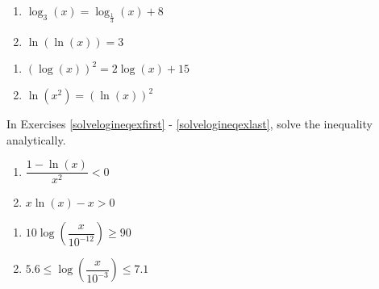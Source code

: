 \begin{multicols}{2}
\begin{enumerate}
\setcounter{enumi}{\value{HW}}

\item $\log_{3}(x) = \log_{\frac{1}{3}}(x) + 8$

\item $\ln(\ln(x)) = 3$

\setcounter{HW}{\value{enumi}}
\end{enumerate}
\end{multicols}

\begin{multicols}{2}
\begin{enumerate}
\setcounter{enumi}{\value{HW}}

\item $\left(\log(x)\right)^2=2\log(x)+15$

\item $\ln(x^{2}) = (\ln(x))^{2}$ \label{solvelogeqexlast}

\setcounter{HW}{\value{enumi}}
\end{enumerate}
\end{multicols}


In Exercises \ref{solvelogineqexfirst} - \ref{solvelogineqexlast}, solve the inequality analytically.

\begin{multicols}{2}
\begin{enumerate}
\setcounter{enumi}{\value{HW}}

\item $\dfrac{1 - \ln(x)}{x^{2}} < 0$ \label{solvelogineqexfirst}
\item $x\ln(x) - x > 0$ 


\setcounter{HW}{\value{enumi}}
\end{enumerate}
\end{multicols}

\begin{multicols}{2}
\begin{enumerate}
\setcounter{enumi}{\value{HW}}

\item $10\log\left(\dfrac{x}{10^{-12}}\right) \geq 90$ \label{sixfourdecibelineq} 
\item $5.6 \leq \log\left(\dfrac{x}{10^{-3}}\right) \leq 7.1$ \label{sixfourRichterineq}


\setcounter{HW}{\value{enumi}}
\end{enumerate}
\end{multicols}

